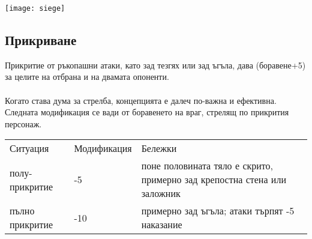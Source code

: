 \begin{footnotesize}
\begin{multicols}{2}
\texttt{[image: siege]}~


\subsection{Прикриване}
Прикритие от ръкопашни атаки, като зад тезгях или зад ъгъла, дава (боравене+5) за целите на отбрана и на двамата опоненти.
\\
\\
Когато става дума за стрелба, концепцията е далеч по-важна и ефективна.
Следната модификация се вади от боравенето на враг, стрелящ по прикрития персонаж.
\\
\begin{tabular}{p{2cm} | p{1cm} | p{5cm}}
Ситуация        & Модификация & Бележки \\
полу-прикритие  & -5          & поне половината тяло е скрито, примерно зад крепостна стена или заложник \\
пълно прикритие & -10         & примерно зад ъгъла; атаки търпят -5 наказание                            \\
\end{tabular}
\end{multicols}

 

\end{footnotesize}
